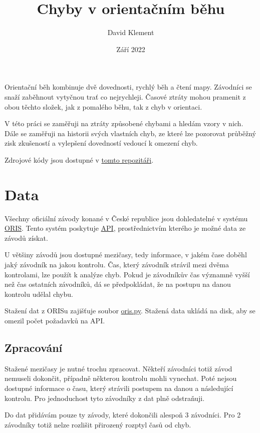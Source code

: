 \documentclass[a4paper,11pt]{article}
\title{\Huge Chyby v orientačním běhu}
\author{David Klement}
\date{Září 2022}
\begin{document}
\maketitle
\thispagestyle{empty}
\pagebreak

Orientační běh kombinuje dvě dovednosti, rychlý běh a čtení mapy. Závodníci se
snaží zaběhnout vytyčnou trať co nejrychleji. Časové ztráty mohou pramenit z
obou těchto složek, jak z pomalého běhu, tak z chyb v orientaci.

V této práci se zaměřuji na ztráty způsobené chybami a hledám vzory v nich. Dále
se zaměřuji na historii svých vlastních chyb, ze které lze pozorovat průběžný
zisk zkušeností a vylepšení dovedností vedoucí k omezení chyb.

Zdrojové kódy jsou dostupné v \href{TODO}{tomto repozitáři}.

\section*{Data}

Všechny oficiální závody konané v České republice jsou dohledatelné v systému
\href{https://oris.orientacnisporty.cz/?sport=1}{ORIS}. Tento systém poskytuje
\href{https://oris.orientacnisporty.cz/API}{API}, prostřednictvím kterého je možné
data ze závodů získat.

U většiny závodů jsou dostupné mezičasy, tedy informace, v jakém čase doběhl
jaký závodník na jakou kontrolu. Čas, který závodník strávil mezi dvěma
kontrolami, lze použít k analýze chyb. Pokud je závodníkův čas významně vyšší
než čas ostatních závodníků, dá se předpokládat, že na postupu na danou kontrolu
udělal chybu.

Stažení dat z ORISu zajišťuje soubor \href{TODO}{oris.py}. Stažená data ukládá na disk,
aby se omezil počet požadavků na API.

\subsection*{Zpracování}

Stažené mezičasy je nutné trochu zpracovat. Někteří závodníci totiž závod
nemuseli dokončit, případně některou kontrolu mohli vynechat. Poté nejsou
dostupné informace o času, který strávili postupem na danou a následující
kontrolu. Pro jednoduchost tyto závodníky z dat plně odstraňuji.

Do dat přidávám pouze ty závody, které dokončili alespoň 3 závodníci. Pro 2
závodníky totiž nelze rozlišit přirozený rozptyl časů od chyb.
\end{document}
